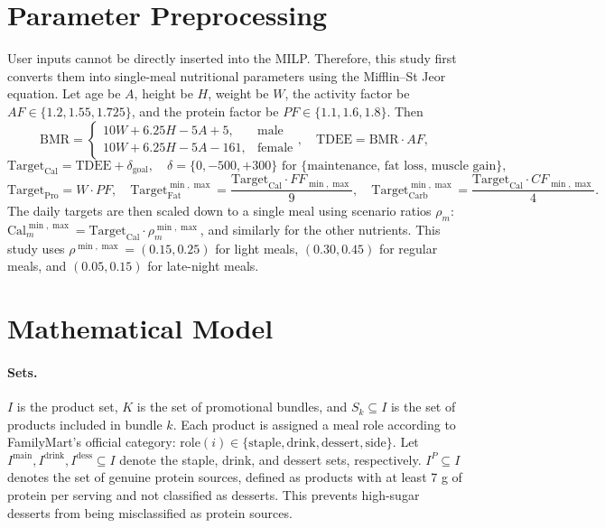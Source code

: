 \documentclass[a4paper]{article}
\begin{document}
\section{Parameter Preprocessing}\label{sec:pre}
User inputs cannot be directly inserted into the MILP. Therefore, this study first converts them into single-meal nutritional parameters using the Mifflin--St Jeor equation. Let age be $A$, height be $H$, weight be $W$, the activity factor be $AF \in \{1.2,1.55,1.725\}$, and the protein factor be $PF \in \{1.1,1.6,1.8\}$. Then
\[
\text{BMR} = \begin{cases}10W+6.25H-5A+5, & \text{male}\\10W+6.25H-5A-161, & \text{female}\end{cases},\quad
\text{TDEE} = \text{BMR}\cdot AF,
\]
\[
\text{Target}_{\text{Cal}} = \text{TDEE} + \delta_{\text{goal}}, \quad
\delta = \{0, -500, +300\} \text{ for \{maintenance, fat loss, muscle gain\}},
\]
\[
\text{Target}_{\text{Pro}} = W \cdot PF, \quad
\text{Target}_{\text{Fat}}^{\min,\max} = \frac{\text{Target}_{\text{Cal}}\cdot FF_{\min,\max}}{9},\quad
\text{Target}_{\text{Carb}}^{\min,\max} = \frac{\text{Target}_{\text{Cal}}\cdot CF_{\min,\max}}{4}.
\]
The daily targets are then scaled down to a single meal using scenario ratios $\rho_m$: $\text{Cal}^{\min,\max}_m = \text{Target}_{\text{Cal}}\cdot \rho^{\min,\max}_m$, and similarly for the other nutrients. This study uses $\rho^{\min,\max}=(0.15,0.25)$ for light meals, $(0.30,0.45)$ for regular meals, and $(0.05,0.15)$ for late-night meals.

\section{Mathematical Model}\label{sec:model}
\paragraph{Sets.}$I$ is the product set, $K$ is the set of promotional bundles, and $S_k\subseteq I$ is the set of products included in bundle $k$. Each product is assigned a meal role according to FamilyMart's official category: $\mathrm{role}(i)\in\{\text{staple},\text{drink},\text{dessert},\text{side}\}$. Let $I^{\mathrm{main}}, I^{\mathrm{drink}}, I^{\mathrm{dess}}\subseteq I$ denote the staple, drink, and dessert sets, respectively. $I^P\subseteq I$ denotes the set of genuine protein sources, defined as products with at least 7 g of protein per serving and not classified as desserts. This prevents high-sugar desserts from being misclassified as protein sources.
\end{document}
